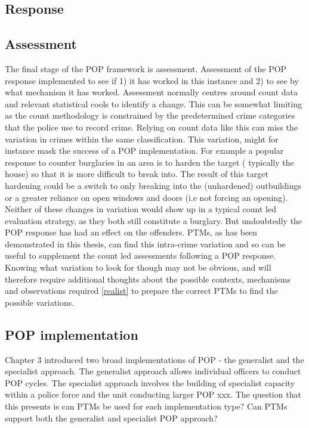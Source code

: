 \subsection{Response}
\subsection{Assessment} The final stage of the POP framework is assessment. Assessment of the POP response implemented to see if 1) it has worked in this instance and 2) to see by what mechanism it has worked. Assessment normally centres around count data and relevant statistical cools to identify a change. This can be somewhat limiting as the count methodology is constrained by the predetermined crime categories that the police use to record crime. Relying on count data like this can miss the variation in crimes within the same classification. This variation, might for instance mask the success of a POP implementation. For example a popular response to counter burglaries in an area is to harden the target ( typically the house) so that it is more difficult to break into. The result of this target hardening could be a switch to only breaking into the (unhardened) outbuildings or a greater reliance on open windows and doors (i.e not forcing an opening). Neither of these changes in variation would show up in a typical count led evaluation strategy, as they both still constitute a burglary. But undoubtedly the POP response has had an effect on the offenders. PTMs, as has been demonstrated in this thesis, can find this intra-crime variation and so can be useful to supplement the count led assessments following a POP response. Knowing what variation to look for though may not be obvious, and will therefore require additional thoughts about the possible contexts, mechanisms and observations required \ref{realist} to prepare the correct PTMs to find the possible variations.

\subsection{POP implementation} Chapter 3 introduced two broad implementations of POP - the generalist and the specialist approach. The generalist approach allows individual officers to conduct POP cycles. The specialist approach involves the building of specialist capacity within a police force and the unit conducting larger POP xxx. The question that this presents is can PTMs be used for each implementation type? Can PTMs support both the generalist and specialist POP approach? 

